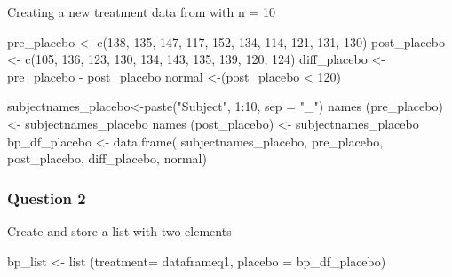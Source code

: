 \documentclass[
  letterpaper,
  DIV=11,
  numbers=noendperiod]{scrartcl}
\newenvironment{Shaded}{\begin{snugshade}}{\end{snugshade}}
\newcommand{\AttributeTok}[1]{\textcolor[rgb]{0.40,0.45,0.13}{#1}}
\newcommand{\DecValTok}[1]{\textcolor[rgb]{0.68,0.00,0.00}{#1}}
\newcommand{\FunctionTok}[1]{\textcolor[rgb]{0.28,0.35,0.67}{#1}}
\newcommand{\NormalTok}[1]{\textcolor[rgb]{0.00,0.23,0.31}{#1}}
\newcommand{\OtherTok}[1]{\textcolor[rgb]{0.00,0.23,0.31}{#1}}
\newcommand{\SpecialCharTok}[1]{\textcolor[rgb]{0.37,0.37,0.37}{#1}}
\newcommand{\StringTok}[1]{\textcolor[rgb]{0.13,0.47,0.30}{#1}}
\begin{document}
Creating a new treatment data from with n = 10

\begin{Shaded}
\begin{Highlighting}[]
\NormalTok{pre\_placebo }\OtherTok{\textless{}{-}} \FunctionTok{c}\NormalTok{(}\DecValTok{138}\NormalTok{, }\DecValTok{135}\NormalTok{, }\DecValTok{147}\NormalTok{, }\DecValTok{117}\NormalTok{, }\DecValTok{152}\NormalTok{, }\DecValTok{134}\NormalTok{, }\DecValTok{114}\NormalTok{, }\DecValTok{121}\NormalTok{, }\DecValTok{131}\NormalTok{, }\DecValTok{130}\NormalTok{)}
\NormalTok{post\_placebo }\OtherTok{\textless{}{-}} \FunctionTok{c}\NormalTok{(}\DecValTok{105}\NormalTok{, }\DecValTok{136}\NormalTok{, }\DecValTok{123}\NormalTok{, }\DecValTok{130}\NormalTok{, }\DecValTok{134}\NormalTok{, }\DecValTok{143}\NormalTok{, }\DecValTok{135}\NormalTok{, }\DecValTok{139}\NormalTok{, }\DecValTok{120}\NormalTok{, }\DecValTok{124}\NormalTok{)}
\NormalTok{diff\_placebo }\OtherTok{\textless{}{-}}\NormalTok{ pre\_placebo }\SpecialCharTok{{-}}\NormalTok{ post\_placebo}
\NormalTok{normal }\OtherTok{\textless{}{-}}\NormalTok{(post\_placebo }\SpecialCharTok{\textless{}} \DecValTok{120}\NormalTok{)}

\NormalTok{subjectnames\_placebo}\OtherTok{\textless{}{-}}\FunctionTok{paste}\NormalTok{(}\StringTok{"Subject"}\NormalTok{, }\DecValTok{1}\SpecialCharTok{:}\DecValTok{10}\NormalTok{, }\AttributeTok{sep =} \StringTok{"\_"}\NormalTok{)}
\FunctionTok{names}\NormalTok{ (pre\_placebo) }\OtherTok{\textless{}{-}}\NormalTok{ subjectnames\_placebo}
\FunctionTok{names}\NormalTok{ (post\_placebo) }\OtherTok{\textless{}{-}}\NormalTok{ subjectnames\_placebo}
\NormalTok{bp\_df\_placebo }\OtherTok{\textless{}{-}} \FunctionTok{data.frame}\NormalTok{( subjectnames\_placebo, pre\_placebo, post\_placebo, diff\_placebo, normal)}
\end{Highlighting}
\end{Shaded}

\subsubsection{Question 2}\label{question-2-1}

Create and store a list with two elements

\begin{Shaded}
\begin{Highlighting}[]
\NormalTok{bp\_list }\OtherTok{\textless{}{-}} \FunctionTok{list}\NormalTok{ (}\AttributeTok{treatment=}\NormalTok{ dataframeq1, }\AttributeTok{placebo =}\NormalTok{ bp\_df\_placebo)}
\end{Highlighting}
\end{Shaded}
\end{document}
